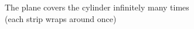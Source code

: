 \documentclass[preview]{standalone}
\begin{document}
\begin{center}
The plane covers the cylinder infinitely many times\\(each strip wraps around once)
\end{center}
\end{document}
